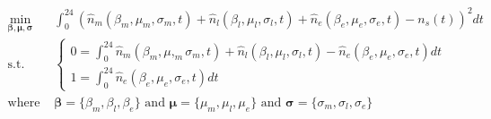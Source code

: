 \begin{equation}
\begin{split}
	\min_{\boldsymbol{\beta}, \boldsymbol{\mu}, \boldsymbol{\sigma}}& \int_{0}^{24}\left(\hat{n}_m(\beta_m,\mu_m,\sigma_m,t) + \hat{n}_l(\beta_l,\mu_l,\sigma_l,t) + \hat{n}_e(\beta_e,\mu_e,\sigma_e,t) - n_s(t)\right)^2 dt\\
	\text{s.t.}&
	\begin{cases}
		0 = \int_{0}^{24}\hat{n}_m(\beta_m,\mu,_m\sigma_m,t) + \hat{n}_l(\beta_l,\mu_l,\sigma_l,t) - \hat{n}_e(\beta_e,\mu_e,\sigma_e,t) dt \\
		1 = \int_{0}^{24}\hat{n}_e(\beta_e,\mu_e,\sigma_e,t) dt
	\end{cases}\\
	\text{where }& \boldsymbol{\beta} = \{\beta_m, \beta_l, \beta_e\} \text{ and } \boldsymbol{\mu} = \{\mu_m, \mu_l, \mu_e\} \text{ and } \boldsymbol{\sigma}  = \{\sigma_m, \sigma_l, \sigma_e\}
\end{split}
\label{ch6:equ:normal-distribution-minimisation}
\end{equation}